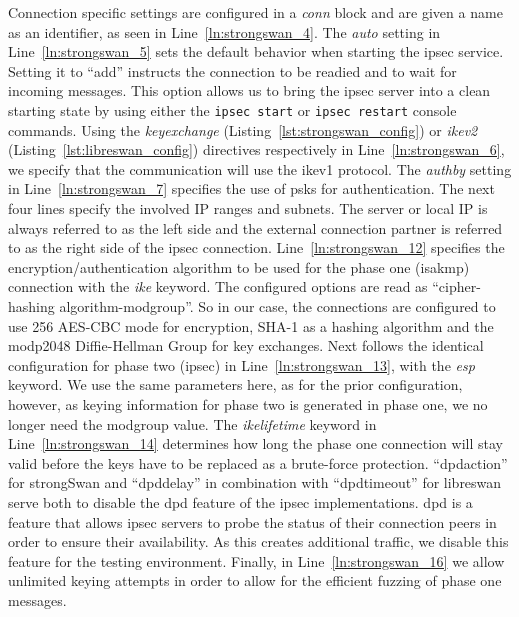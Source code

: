 Connection specific settings are configured in a \emph{conn} block and are given a name as an identifier, as seen in Line~\ref{ln:strongswan_4}. The \emph{auto} setting in Line~\ref{ln:strongswan_5} sets the default behavior when starting the \ac{ipsec} service. Setting it to ``add'' instructs the connection to be readied and to wait for incoming messages. This option allows us to bring the \ac{ipsec} server into a clean starting state by using either the \texttt{ipsec start} or \texttt{ipsec restart} console commands. Using the \emph{keyexchange} (Listing~\ref{lst:strongswan_config}) or 
\emph{ikev2} (Listing~\ref{lst:libreswan_config}) directives respectively in Line~\ref{ln:strongswan_6}, we specify that the communication will use the \ac{ike}v1 protocol. The \emph{authby} setting in Line~\ref{ln:strongswan_7} specifies the use of \acp{psk} for authentication. The next four lines specify the involved IP ranges and subnets. The server or local IP is always referred to as the left side and the external connection partner is referred to as the right side of the \ac{ipsec} connection. Line~\ref{ln:strongswan_12} specifies the encryption/authentication algorithm to be used for the phase one (\ac{isakmp}) connection with the \emph{ike} keyword. The configured options are read as ``cipher-hashing algorithm-modgroup''. So in our case, the connections are configured to use \SI{256}{\bit} AES-CBC mode for encryption, SHA-1 as a hashing algorithm and the modp2048 Diffie-Hellman Group for key exchanges. Next follows the identical configuration for phase two (\ac{ipsec}) in Line~\ref{ln:strongswan_13}, with the \emph{esp} keyword. We use the same parameters here, as for the prior configuration, however, as keying information for phase two is generated in phase one, we no longer need the modgroup value. The \emph{ikelifetime} keyword in Line~\ref{ln:strongswan_14} determines how long the phase one connection will stay valid before the keys have to be replaced as a brute-force protection. ``dpdaction'' for strongSwan and ``dpddelay'' in combination with ``dpdtimeout'' for libreswan serve both to disable the \ac{dpd} feature of the \ac{ipsec} implementations. \ac{dpd} is a feature that allows \ac{ipsec} servers to probe the status of their connection peers in order to ensure their availability. As this creates additional traffic, we disable this feature for the testing environment. Finally, in Line~\ref{ln:strongswan_16} we allow unlimited keying attempts in order to allow for the efficient fuzzing of phase one messages. \\

